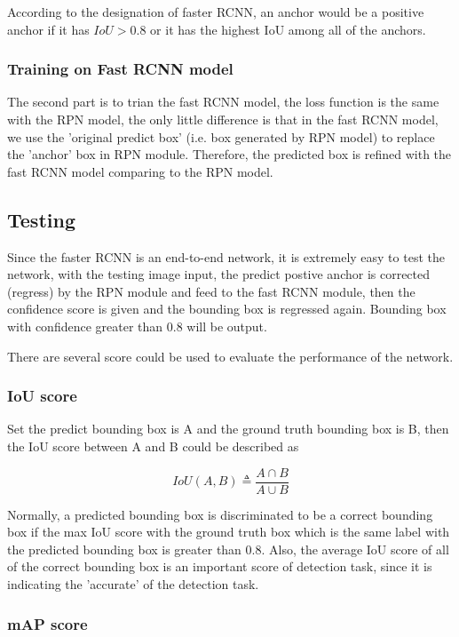 \documentclass{IEEEtran}
\begin{document}
According to the designation of faster RCNN, an anchor would be a positive anchor if it has $IoU > 0.8$ or it has the highest IoU among
all of the anchors.

\subsubsection{Training on Fast RCNN model}
The second part is to trian the fast RCNN model, the loss function is the same with the RPN model, the only little difference is that
in the fast RCNN model, we use the 'original predict box' (i.e. box generated by RPN model) to replace the 'anchor' box in RPN module.
Therefore, the predicted box is refined with the fast RCNN model comparing to the RPN model.

\subsection{Testing}
Since the faster RCNN is an end-to-end network, it is extremely easy to test the network, with the testing image input, the predict postive anchor is corrected (regress) by the RPN module and feed to the fast RCNN module, then the confidence score is given and the
bounding box is regressed again. Bounding box with confidence greater than 0.8 will be output.

There are several score could be used to evaluate the performance of the network.

\subsubsection{IoU score}

Set the predict bounding box is A and the ground truth bounding box is B, then the IoU score between A and B could be described as

\begin{equation}
    IoU(A,B) \triangleq \frac{A\cap B}{A\cup B}
\end{equation}

Normally, a predicted bounding box is discriminated to be a correct bounding box if the max IoU score with the ground truth box which is 
the same label with the predicted bounding box is greater than 0.8. Also, the average IoU score of all of the correct bounding box is an important score of detection task, since it is indicating the 'accurate' of the detection task.

\subsubsection{mAP score}
\end{document}
